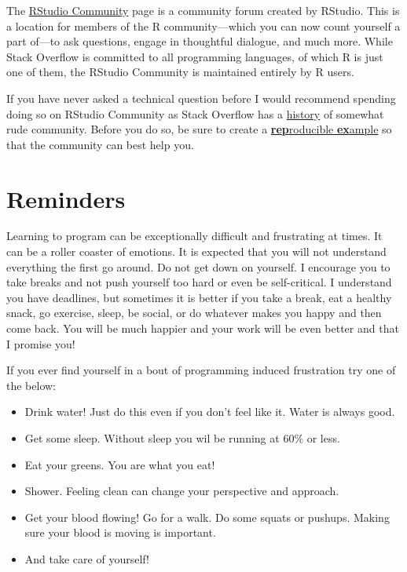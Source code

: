\documentclass[
]{book}
\providecommand{\tightlist}{%
  \setlength{\itemsep}{0pt}\setlength{\parskip}{0pt}}
\begin{document}
The \href{https://community.rstudio.com/}{RStudio Community} page is a community forum created by RStudio. This is a location for members of the R community---which you can now count yourself a part of---to ask questions, engage in thoughtful dialogue, and much more. While Stack Overflow is committed to all programming languages, of which R is just one of them, the RStudio Community is maintained entirely by R users.

If you have never asked a technical question before I would recommend spending doing so on RStudio Community as Stack Overflow has a \href{https://meta.stackoverflow.com/questions/262791/the-rudeness-on-stack-overflow-is-too-damn-high}{history} of somewhat rude community. Before you do so, be sure to create a \href{https://www.tidyverse.org/help/\#reprex}{\textbf{rep}roducible \textbf{ex}ample} so that the community can best help you.

\hypertarget{reminders}{%
\section{Reminders}\label{reminders}}

Learning to program can be exceptionally difficult and frustrating at times. It can be a roller coaster of emotions. It is expected that you will not understand everything the first go around. Do not get down on yourself. I encourage you to take breaks and not push yourself too hard or even be self-critical. I understand you have deadlines, but sometimes it is better if you take a break, eat a healthy snack, go exercise, sleep, be social, or do whatever makes you happy and then come back. You will be much happier and your work will be even better and that I promise you!

If you ever find yourself in a bout of programming induced frustration try one of the below:

\begin{itemize}
\tightlist
\item
  Drink water! Just do this even if you don't feel like it. Water is always good.
\item
  Get some sleep. Without sleep you wil be running at 60\% or less.
\item
  Eat your greens. You are what you eat!
\item
  Shower. Feeling clean can change your perspective and approach.
\item
  Get your blood flowing! Go for a walk. Do some squats or pushups. Making sure your blood is moving is important.
\item
  And take care of yourself!
\end{itemize}
\end{document}
